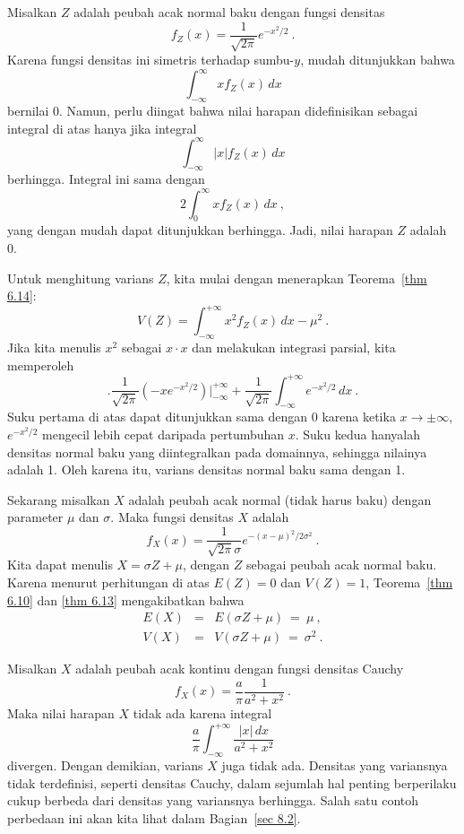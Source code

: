 {\begin{example}\label{exam 6.22} Misalkan $Z$ adalah peubah acak normal baku dengan
fungsi densitas
$$ f_Z(x) = \frac 1{\sqrt{2\pi}} e^{-x^2/2}\ .
$$ Karena fungsi densitas ini simetris terhadap sumbu-$y$, mudah ditunjukkan bahwa
$$\int_{-\infty}^\infty x f_Z(x)\, dx$$ bernilai 0. Namun, perlu diingat bahwa nilai
harapan didefinisikan sebagai integral di atas hanya jika integral
$$\int_{-\infty}^\infty |x| f_Z(x)\, dx$$ berhingga. Integral ini sama dengan
$$2\int_0^\infty x f_Z(x)\, dx\ ,$$ yang dengan mudah dapat ditunjukkan berhingga.
Jadi, nilai harapan $Z$ adalah 0.
\par Untuk menghitung varians $Z$, kita mulai dengan menerapkan Teorema~\ref{thm 6.14}:
$$V(Z) =  \int_{-\infty}^{+\infty} x^2 f_Z(x)\, dx - \mu^2\ .$$ Jika kita menulis
$x^2$ sebagai $x\cdot x$ dan melakukan integrasi parsial, kita memperoleh
$$\biggl.\frac 1{\sqrt{2\pi}} (-x e^{-x^2/2})\biggr|_{-\infty}^{+\infty} + \frac
1{\sqrt{2\pi}} \int_{-\infty}^{+\infty} e^{-x^2/2}\, dx\ .
$$ Suku pertama di atas dapat ditunjukkan sama dengan 0 karena ketika $x \rightarrow
\pm \infty$, $e^{-x^2/2}$ mengecil lebih cepat daripada pertumbuhan $x$. Suku kedua
hanyalah densitas normal baku yang diintegralkan pada domainnya, sehingga nilainya
adalah 1. Oleh karena itu, varians densitas normal baku sama dengan 1.
\par Sekarang misalkan $X$ adalah peubah acak normal (tidak harus baku) dengan
parameter $\mu$ dan $\sigma$. Maka fungsi densitas $X$ adalah
$$ f_X(x) = \frac 1{\sqrt{2\pi}\sigma} e^{-(x - \mu)^2/2\sigma^2}\ .
$$ Kita dapat menulis $X = \sigma Z + \mu$, dengan $Z$ sebagai peubah acak normal
baku. Karena menurut perhitungan di atas $E(Z) = 0$ dan $V(Z) = 1$,
Teorema~\ref{thm 6.10} dan \ref{thm 6.13} mengakibatkan bahwa
\begin{eqnarray*} 
E(X)  &=& E(\sigma Z + \mu)\ =\ \mu\ , \\ 
V(X)  &=& V(\sigma Z + \mu)\ =\ \sigma^2\ .
\end{eqnarray*}
\end{example}

\begin{example}\label{exam 6.23} Misalkan $X$ adalah peubah acak kontinu dengan fungsi
densitas Cauchy
$$ f_X(x) = \frac {a}{\pi} \frac {1}{a^2 + x^2}\ .
$$ Maka nilai harapan $X$ tidak ada karena integral
$$
\frac a\pi \int_{-\infty}^{+\infty} \frac {|x|\,dx}{a^2 + x^2}
$$ divergen. Dengan demikian, varians $X$ juga tidak ada. Densitas yang variansnya
tidak terdefinisi, seperti densitas Cauchy, dalam sejumlah hal penting berperilaku
cukup berbeda dari densitas yang variansnya berhingga. Salah satu contoh perbedaan ini
akan kita lihat dalam Bagian~\ref{sec 8.2}.
\end{example}


}
